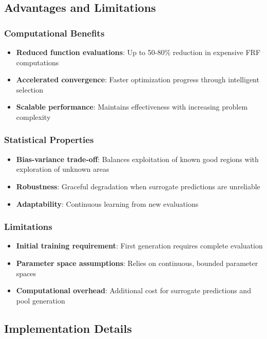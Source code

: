 \documentclass[12pt,a4paper]{article}
\begin{document}
\subsection{Advantages and Limitations}

\subsubsection{Computational Benefits}
\begin{itemize}
\item \textbf{Reduced function evaluations}: Up to 50-80\% reduction in expensive FRF computations
\item \textbf{Accelerated convergence}: Faster optimization progress through intelligent selection
\item \textbf{Scalable performance}: Maintains effectiveness with increasing problem complexity
\end{itemize}

\subsubsection{Statistical Properties}
\begin{itemize}
\item \textbf{Bias-variance trade-off}: Balances exploitation of known good regions with exploration of unknown areas
\item \textbf{Robustness}: Graceful degradation when surrogate predictions are unreliable
\item \textbf{Adaptability}: Continuous learning from new evaluations
\end{itemize}

\subsubsection{Limitations}
\begin{itemize}
\item \textbf{Initial training requirement}: First generation requires complete evaluation
\item \textbf{Parameter space assumptions}: Relies on continuous, bounded parameter spaces
\item \textbf{Computational overhead}: Additional cost for surrogate predictions and pool generation
\end{itemize}

\subsection{Implementation Details}
\end{document}
